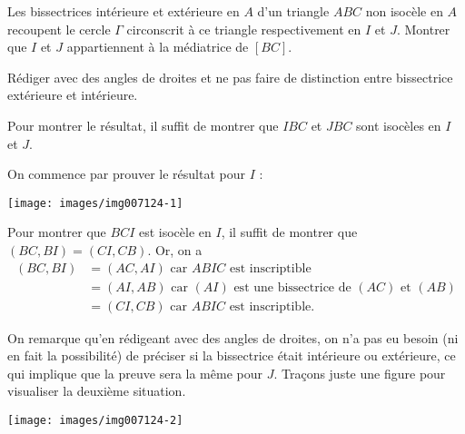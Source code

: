 \begin{exo}%
Les bissectrices intérieure et extérieure en $A$ d'un triangle $ABC$ non isocèle en $A$ recoupent le cercle $\Gamma$ circonscrit à ce triangle respectivement en $I$ et $J$. Montrer que $I$ et $J$ appartiennent à la médiatrice de $[BC]$.

\begin{hint}   
Rédiger avec des angles de droites et ne pas faire de distinction entre bissectrice extérieure et intérieure.
\end{hint}      

\begin{sol} 

Pour montrer le résultat, il suffit de montrer que $IBC$ et $JBC$ sont isocèles en $I$ et $J$. 

On commence par prouver le résultat pour $I$ :

\begin{center}
\texttt{[image: images/img007124-1]}
\end{center}

Pour montrer que $BCI$ est isocèle en $I$, il suffit de montrer que $(BC,BI) = (CI,CB)$. Or, on a 
\begin{align*}
(BC,BI) &= (AC,AI) \text{ car $ABIC$ est inscriptible}\\
&= (AI,AB) \text{ car $(AI)$ est une bissectrice de $(AC)$ et $(AB)$}\\
&= (CI,CB) \text{ car $ABIC$ est inscriptible.}
\end{align*}

On remarque qu'en rédigeant avec des angles de droites, on n'a pas eu besoin (ni en fait la possibilité) de préciser si la bissectrice était intérieure ou extérieure, ce qui implique que la preuve sera la même pour $J$. Traçons juste une figure pour visualiser la deuxième situation.


\begin{center}
\texttt{[image: images/img007124-2]}
\end{center}



\end{sol}  
\end{exo}  


